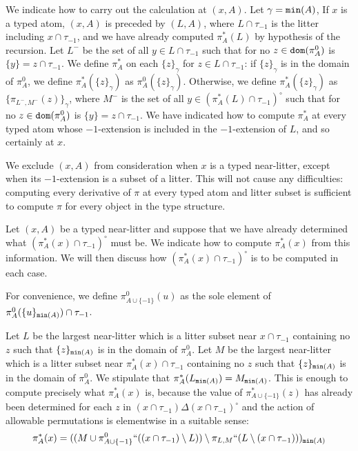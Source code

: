 \documentclass[112pt]{article}
\begin{document}
\begin{description}
We indicate how to carry out the calculation at $(x,A)$.  Let $\gamma = {\tt min}(A)$,  If $x$ is a typed atom, $(x,A)$ is preceded by $(L,A)$, where $L \cap \tau_{-1}$
is the litter including $x \cap \tau_{-1}$, and we have already computed $\pi^*_A(L)$ by hypothesis of the recursion.  Let $L^-$ be the set of all $y\in L \cap \tau_{-1}$ such that for no $z \in {\tt dom}(\pi^0_A)$ is $\{y\}= z \cap \tau_{-1}$.  We define $\pi^*_{A}$ on each $\{z\}_\gamma$ for $z \in L \cap \tau_{-1}$:
if $\{z\}_\gamma$ is in the domain of $\pi^0_A$, we define $\pi^*_A(\{z\}_\gamma)$ as $\pi^0_A(\{z\}_\gamma)$.  Otherwise, we define
$\pi^*_A(\{z\}_\gamma)$ as $\{\pi_{L^-,M^-}(z)\}_\gamma$, where $M^-$ is the set of all $y\in (\pi_A^*(L) \cap \tau_{-1})^\circ$ such that for no $z \in {\tt dom}(\pi^0_A)$ is $\{y\}=z \cap \tau_{-1}$.   We have indicated how to compute $\pi^*_A$ at every typed atom whose $-1$-extension is included in the $-1$-extension of $L$, and so certainly at $x$.

We exclude $(x,A)$ from consideration when $x$ is a typed near-litter, except when its $-1$-extension is a subset of a litter.  This will not cause
any difficulties:  computing every derivative of $\pi$ at every typed atom and litter subset is sufficient to compute $\pi$ for every object in the type structure.

Let $(x,A)$ be a typed near-litter and suppose that we have already determined what $(\pi^*_A(x) \cap \tau_{-1})^\circ$ must be.   We indicate how
to compute $\pi^*_A(x)$ from this information.  We will then discuss how $(\pi^*_A(x) \cap \tau_{-1})^\circ$  is to be computed in each case.

For convenience, we define $\pi^0_{A \cup \{-1\}}(u)$ as the sole element of  $\pi^0_A(\{u\}_{{\tt min}(A)}) \cap \tau_{-1}$.

Let $L$ be the largest near-litter which is a litter subset near $x \cap \tau_{-1}$ containing no $z$ such that $\{z\}_{{\tt min}(A)}$ is in the domain of $\pi^0_A$.
Let $M$ be the largest  near-litter which is a litter subset near $\pi^*_A(x) \cap \tau_{-1}$ containing no $z$ such that $\{z\}_{{\tt min}(A)}$ is in the domain of $\pi^0_A$.
We stipulate that $\pi^*_A(L_{{\tt min}(A)}) = M_{{\tt min}(A)}$.  This is enough to compute precisely what $\pi^*_A(x)$ is, because
the value of $\pi^*_{A \cup \{-1\}}(z)$ has already been determined for each $z$ in $(x \cap \tau_{-1}) \Delta (x \cap \tau_{-1})^\circ$ and the action of allowable permutations is elementwise in a suitable sense:  $$\pi^*_A(x) = ((M \cup \pi^0_{A \cup \{-1\}}``((x\cap \tau_{-1}) \setminus L)) \setminus \pi_{L,M}``(L\setminus (x\cap \tau_{-1})))_{{\tt min}(A)}$$


\end{description}
\end{document}
